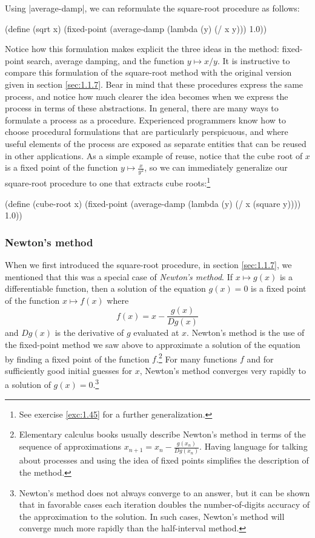 Using \scheme|average-damp|, we can reformulate the square-root procedure
as follows:

\begin{schemedisplay}
(define (sqrt x)
  (fixed-point (average-damp (lambda (y) (/ x y)))
               1.0))
\end{schemedisplay}
Notice how this formulation makes explicit the three ideas in the
method: fixed-point search, average damping, and the function $y
\mapsto x/y$.  It is instructive to compare this formulation of the
square-root method with the original version given in section
\ref{sec:1.1.7}.  Bear in mind that these procedures express the same
process, and notice how much clearer the idea becomes when we express
the process in terms of these abstractions.  In general, there are
many ways to formulate a process as a procedure.  Experienced
programmers know how to choose procedural formulations that are
particularly perspicuous, and where useful elements of the process are
exposed as separate entities that can be reused in other applications.
As a simple example of reuse, notice that the cube root of $x$ is a
fixed point of the function $y \mapsto \frac{x}{y^2}$, so we can
immediately generalize our square-root procedure to one that extracts
cube roots:\footnote{See exercise \ref{exc:1.45} for a further
  generalization.}


\begin{schemedisplay}
(define (cube-root x)
  (fixed-point (average-damp (lambda (y) (/ x (square y))))
               1.0))
\end{schemedisplay}



\subsubsection*{Newton's method}

When we first introduced the square-root procedure, in
section \ref{sec:1.1.7}, we mentioned that this was a special case of
\textit{Newton's method}.  
If $x \mapsto g(x)$ is a differentiable function, then a solution of
the equation $g(x) = 0$ is a fixed point of the function $x \mapsto f(x)$
where
\begin{displaymath}
  f(x) = x - \frac{g(x)}{Dg(x)}
\end{displaymath}
and $Dg(x)$ is the derivative of $g$ evaluated at $x$.  Newton's
method is the use of the fixed-point method we saw above to
approximate a solution of the equation by finding a fixed point of the
function $f$.\footnote{Elementary calculus books usually describe
  Newton's method in terms of the sequence of approximations $x_{n+1}
  = x_n - \frac{g(x_n)}{Dg(x_n)}$.  Having language for talking about
  processes and using the idea of fixed points simplifies the
  description of the method.} For many functions $f$ and for
sufficiently good initial guesses for $x$, Newton's method converges
very rapidly to a solution of $g(x) = 0$.\footnote{Newton's method
  does not always converge to an answer, but it can be shown that in
  favorable cases each iteration doubles the number-of-digits accuracy
  of the approximation to the solution.  In such cases, Newton's
  method will converge much more rapidly than the half-interval
  method.}

